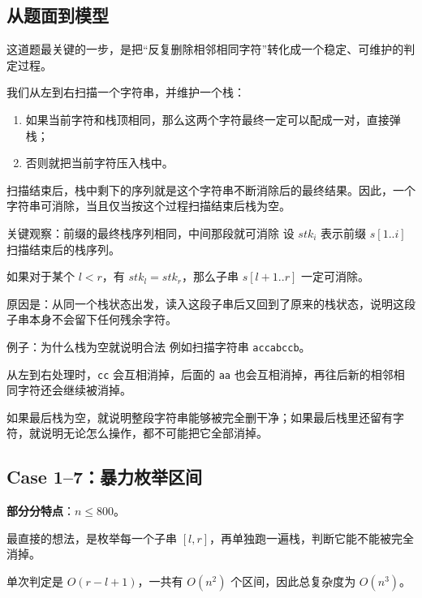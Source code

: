 \documentclass{book}
\begin{document}
    \subsection{从题面到模型}

    这道题最关键的一步，是把“反复删除相邻相同字符”转化成一个稳定、可维护的判定过程。

    我们从左到右扫描一个字符串，并维护一个栈：

    \begin{enumerate}[leftmargin=2em,itemsep=1pt,topsep=2pt,parsep=0pt,partopsep=0pt]
        \item 如果当前字符和栈顶相同，那么这两个字符最终一定可以配成一对，直接弹栈；
        \item 否则就把当前字符压入栈中。
    \end{enumerate}

    扫描结束后，栈中剩下的序列就是这个字符串不断消除后的最终结果。因此，一个字符串可消除，当且仅当按这个过程扫描结束后栈为空。

    \begin{keybox}{关键观察：前缀的最终栈序列相同，中间那段就可消除}
        设 $stk_i$ 表示前缀 $s[1..i]$ 扫描结束后的栈序列。

        如果对于某个 $l < r$，有 $stk_l = stk_r$，那么子串 $s[l+1..r]$ 一定可消除。

        原因是：从同一个栈状态出发，读入这段子串后又回到了原来的栈状态，说明这段子串本身不会留下任何残余字符。
    \end{keybox}

    \begin{examplebox}{例子：为什么栈为空就说明合法}
        例如扫描字符串 \texttt{accabccb}。

        从左到右处理时，\texttt{cc} 会互相消掉，后面的 \texttt{aa} 也会互相消掉，再往后新的相邻相同字符还会继续被消掉。

        如果最后栈为空，就说明整段字符串能够被完全删干净；如果最后栈里还留有字符，就说明无论怎么操作，都不可能把它全部消掉。
    \end{examplebox}

    \subsection{Case 1--7：暴力枚举区间}
    \textbf{部分分特点}：$n \le 800$。

    最直接的想法，是枚举每一个子串 $[l,r]$，再单独跑一遍栈，判断它能不能被完全消掉。

    单次判定是 $O(r-l+1)$，一共有 $O(n^2)$ 个区间，因此总复杂度为 $O(n^3)$。
\end{document}
